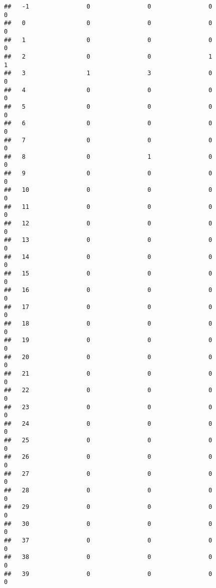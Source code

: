 \documentclass[]{article}
\begin{document}
\begin{verbatim}
##   -1                0                0                0                0
##   0                 0                0                0                0
##   1                 0                0                0                0
##   2                 0                0                1                1
##   3                 1                3                0                0
##   4                 0                0                0                0
##   5                 0                0                0                0
##   6                 0                0                0                0
##   7                 0                0                0                0
##   8                 0                1                0                0
##   9                 0                0                0                0
##   10                0                0                0                0
##   11                0                0                0                0
##   12                0                0                0                0
##   13                0                0                0                0
##   14                0                0                0                0
##   15                0                0                0                0
##   16                0                0                0                0
##   17                0                0                0                0
##   18                0                0                0                0
##   19                0                0                0                0
##   20                0                0                0                0
##   21                0                0                0                0
##   22                0                0                0                0
##   23                0                0                0                0
##   24                0                0                0                0
##   25                0                0                0                0
##   26                0                0                0                0
##   27                0                0                0                0
##   28                0                0                0                0
##   29                0                0                0                0
##   30                0                0                0                0
##   37                0                0                0                0
##   38                0                0                0                0
##   39                0                0                0                0

\end{verbatim}
\end{document}
